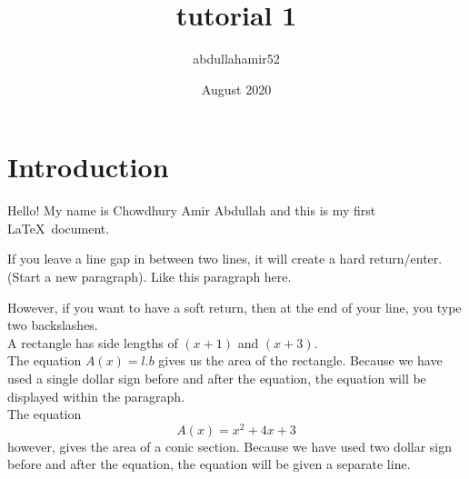 \documentclass[12pt]{article}
\title{tutorial 1}
\author{abdullahamir52 }
\date{August 2020}
\begin{document}
\maketitle

\section{Introduction}

Hello! My name is Chowdhury Amir Abdullah and this is my first \LaTeX\ document.

If you leave a line gap in between two lines, it will create a hard return/enter. (Start a new paragraph). Like this paragraph here. 

However, if you want to have a soft return, then at the end of your line, you type two backslashes. \\
A rectangle has side lengths of $(x +1)$ and $(x+3)$. \\
The equation ${A(x) = l . b}$ gives us the area of the rectangle. Because we have used a single dollar sign before and after the equation, the equation will be displayed within the paragraph.\\
The equation $${A(x) = x^2 +4x+3}$$ however, gives the area of a conic section. Because we have used two dollar sign before and after the equation, the equation will be given a separate line.  
\end{document}
